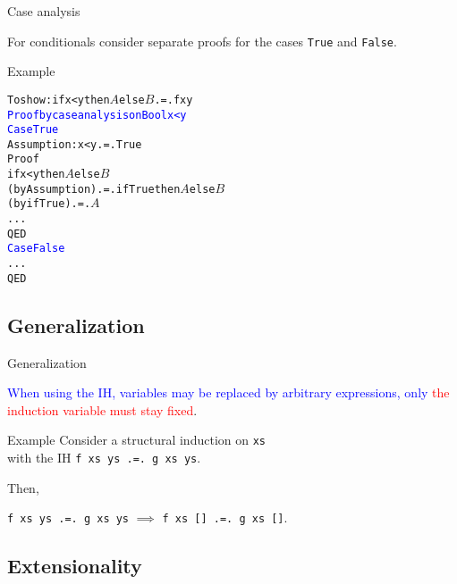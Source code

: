 \documentclass{beamer}
\def\code#1{\texttt{\frenchspacing#1}}
\begin{document}
\begin{frame}[fragile]{Case analysis}

For conditionals consider separate proofs for the cases \code{True} and \code{False}.

\pause

\begin{exampleblock}{Example}
\small\begin{alltt}
To show: if x < y then \(A\) else \(B\) .=. f x y\pause
\textcolor{blue}{Proof by case analysis on Bool x < y}
\textcolor{blue}{Case True}
  Assumption: x < y .=. True
  Proof
                        if x < y then \(A\) else \(B\)\pause
    (by Assumption) .=. if True then \(A\) else \(B\)\pause
    (by ifTrue)     .=. \(A\)
    ...
  QED\pause
\textcolor{blue}{Case False}
  ...
QED
\end{alltt}\normalsize
\end{exampleblock}

\end{frame}

\subsection{Generalization}

\begin{frame}{Generalization}

\begin{center}
    \textcolor{blue}{When using the IH, variables may be replaced by arbitrary expressions, only} \textcolor{red}{the induction variable must stay fixed}.
\end{center}

\pause

\vspace{0.5cm}
\begin{exampleblock}{Example}
Consider a structural induction on \code{xs} \\
with the IH \code{f xs ys .=. g xs ys}. \par\pause
Then,

\begin{center}
    \code{f xs ys .=. g xs ys} $\implies$ \code{f xs [] .=. g xs []}.
\end{center}
\end{exampleblock}

\end{frame}

\subsection{Extensionality}
\end{document}

